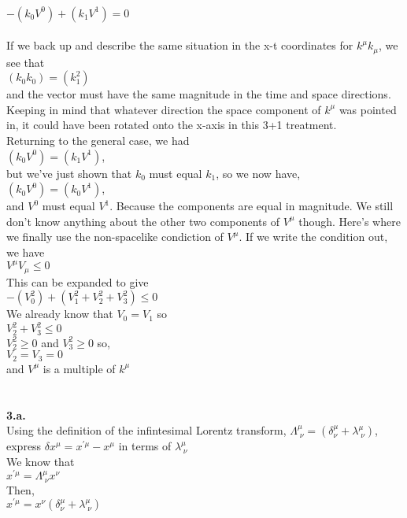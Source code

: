\documentclass[prb,preprint]
{revtex4-1}
\newcommand{\PRLsep}{\noindent\makebox[\linewidth]{\resizebox{0.8888\linewidth}{2pt}{$\bullet$}}\bigskip}
\begin{document}
\\
$-\left(k_0 V^0\right) + \left(k_1 V^1\right) = 0$
\\
\\
If we back up and describe the same situation in the x-t coordinates for $k^\mu k_\mu$, we see that 
\\
$\left(k_0 k_0\right) = \left(k_1^2\right)$
\\
and the vector must have the same magnitude in the time and space directions.  Keeping in mind that whatever direction the space component of $k^\mu$ was pointed in, it could have been rotated onto the x-axis in this 3+1 treatment.
\\
Returning to the general case, we had 
\\
$\left(k_0 V^0\right) = \left(k_1 V^1\right)$, 
\\
but we've just shown that $k_0$ must equal $k_1$, so we now have, 
\\
$\left(k_0 V^0\right) = \left(k_0 V^1\right)$, 
\\
and $V^0$ must equal $V^1$.  Because the components are equal in magnitude.  We still don't know anything about the other two components of $V^\mu$ though.  Here's where we finally use the non-spacelike condiction of $V^\mu$.  If we write the condition out, we have 
\\
$V^\mu V_\mu \leq 0$
\\
This can be expanded to give 
\\
$-\left(V_0^2\right) + \left(V_1^2 + V_2^2 + V_3^2\right) \leq 0$
\\
We already know that $V_0 = V_1$ so
\\
$V_2^2 + V_3^2 \leq 0$
\\
$V_2^2 \geq 0$ and $V_3^2 \geq 0$ so,
\\
$V_2 = V_3 = 0$
\\
and $V^\mu$ is a multiple of $k^\mu$
\\
\\
\PRLsep
\\
\textbf{3.a.}
\\
Using the definition of the infintesimal Lorentz transform, $\Lambda^\mu_{\;\nu} = \left(\delta^\mu_\nu + \lambda^\mu_{\;\nu}\right)$, 
express $\delta x^\mu = x^{\prime\mu} - x^\mu$ in terms of $\lambda^\mu_{\;\nu}$
\\
We know that 
\\
$x^{\prime\mu} = \Lambda^\mu_{\;\nu} x^\nu$
\\
Then,
\\
$x^{\prime\mu} = x^\nu\left(\delta^\mu_\nu + \lambda^\mu_{\;\nu}\right) $
\end{document}
